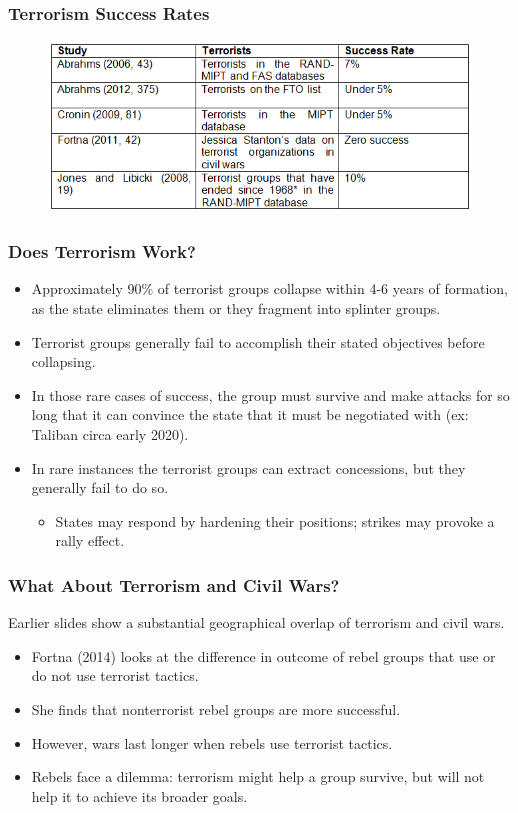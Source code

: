 \documentclass{beamer}
\begin{document}
\begin{frame} 
	\frametitle{\LARGE{Terrorism Success Rates}}
	\begin{figure}[ht!]
		\centering
		\includegraphics[width=\textwidth,height=0.9\textheight,keepaspectratio]{terrorsuccess.png}
	\end{figure}
\end{frame}

\begin{frame} 
	\frametitle{\LARGE{Does Terrorism Work?}}
	\begin{itemize}
		\item Approximately 90\% of terrorist groups collapse within 4-6 years of formation, as the state eliminates them or they fragment into splinter groups. \pause
		\item Terrorist groups generally fail to accomplish their stated objectives before collapsing. \pause
		\item In those rare cases of success, the group must survive and make attacks for so long that it can convince the state that it must be negotiated with (ex: Taliban circa early 2020). \pause
		\item In rare instances the terrorist groups can extract concessions, but they generally fail to do so. \pause
		\begin{itemize}
			\item States may respond by hardening their positions; strikes may provoke a rally effect.
		\end{itemize}
	\end{itemize}
\end{frame}

\begin{frame} 
\frametitle{\LARGE{What About Terrorism and Civil Wars?}}
Earlier slides show a substantial geographical overlap of terrorism and civil wars.
\begin{itemize}
		\item Fortna (2014) looks at the difference in outcome of rebel groups that use or do not use terrorist tactics. \pause 
		\item She finds that nonterrorist rebel groups are more successful. \pause 
		\item However, wars last longer when rebels use terrorist tactics. \pause 
		\item Rebels face a dilemma: terrorism might help a group survive, but will not help it to achieve its broader goals. 
\end{itemize}
\end{frame}
\end{document}
